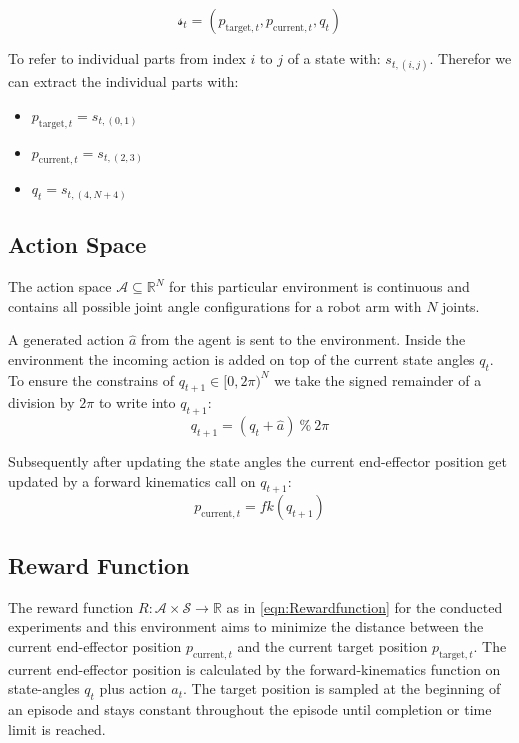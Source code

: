 \begin{equation}[p]\label{eqn: state}
    \mathcal{s}_t = (p_{\text{target}, t}, p_{\text{current}, t}, q_t)
\end{equation}

To refer to individual parts from index $i$ to $j$ of a state with: $s_{t, (i, j)}$. Therefor we can extract the individual parts with:
\begin{itemize}
    \item $p_{\text{target}, t} = s_{t, (0, 1)}$ 
    \item $p_{\text{current}, t} = s_{t, (2, 3)}$
    \item $q_{t} = s_{t, (4, N + 4)}$
\end{itemize}

\subsection{Action Space}

The action space $\mathcal{A} \subseteq \mathbb{R}^N$ for this particular environment is continuous and contains all possible joint angle configurations for a robot arm with $N$ joints. 

A generated action $\hat{a}$ from the agent is sent to the environment. Inside the environment the incoming action is added on top of the current state angles $q_t$. To ensure the constrains of $q_{t+1} \in [0, 2\pi)^N$ we take the signed remainder of a division by $2\pi$ to write into $q_{t+1}$:
\begin{equation*}
    q_{t+1} = (q_t + \hat{a}) \ \% \ 2\pi
\end{equation*}

Subsequently after updating the state angles the current end-effector position get updated by a forward kinematics call on $q_{t+1}$:
\begin{equation*}
    p_{\text{current}, t} = fk(q_{t+1})
\end{equation*}


\subsection{Reward Function}

The reward function $R: \mathcal{A} \times \mathcal{S} \to \mathbb{R}$ as in \eqref{eqn:Rewardfunction} for the conducted experiments and this environment aims to minimize the distance between the current end-effector position $p_{\text{current}, t}$ and the current target position $p_{\text{target}, t}$. The current end-effector position is calculated by the forward-kinematics function on state-angles $q_t$ plus action $a_t$. The target position is sampled at the beginning of an episode and stays constant throughout the episode until completion or time limit is reached. 

